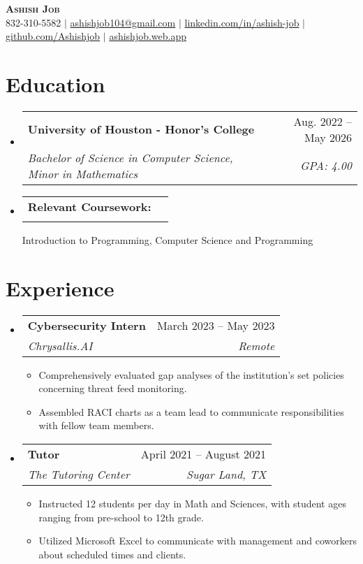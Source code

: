 \documentclass[letterpaper,11pt]{article}
\makeatletter
\newcommand{\resumeItem}[1]{
  \item\small{
    {#1 \vspace{-2pt}}
  }
}
\newcommand{\resumeSubheading}[4]{
  \vspace{-2pt}\item
    \begin{tabular*}{0.97\textwidth}[t]{l@{\extracolsep{\fill}}r}
      \textbf{#1} & #2 \\
      \textit{\small#3} & \textit{\small #4} \\
    \end{tabular*}\vspace{-7pt}
}
\newcommand{\resumeSubSubheading}[2]{
    \item
    \begin{tabular*}{0.97\textwidth}{l@{\extracolsep{\fill}}r}
      \textit{\small#1} & \textit{\small #2} \\
    \end{tabular*}\vspace{-7pt}
}
\newcommand{\resumeSubHeadingListStart}{\begin{itemize}[leftmargin=0.15in, label={}]}
\newcommand{\resumeSubHeadingListEnd}{\end{itemize}}
\newcommand{\resumeItemListStart}{\begin{itemize}}
\newcommand{\resumeItemListEnd}{\end{itemize}\vspace{-5pt}}
\makeatother
\begin{document}

\begin{center}
    \textbf{\Huge \scshape Ashish Job} \\ \vspace{1pt}
    \small {832-310-5582} $|$ \href{mailto:ashishjob104@gmail.com}{{ashishjob104@gmail.com}} $|$ 
    \href{https://linkedin.com/in/ashish-job/}{{linkedin.com/in/ashish-job}} 
    $|$ \href{https://github.com/Ashishjob}{{github.com/Ashishjob}}
    $|$ \href{https://ashishjob.web.app/}{{ashishjob.web.app}}
    
\end{center}


\section{Education}
  \resumeSubHeadingListStart
    \resumeSubheading
      {University of Houston - Honor's College}{Aug. 2022 -- May 2026}
      {Bachelor of Science in Computer Science, Minor in Mathematics}{GPA: 4.00}
    \resumeSubheading{Relevant Coursework:}{}{}{}{Introduction to Programming,}{ Computer Science and Programming}
  \resumeSubHeadingListEnd


\section{Experience}
  \resumeSubHeadingListStart
  
    \resumeSubheading
      {Cybersecurity Intern}{March 2023 -- May 2023}
      {Chrysallis.AI}{Remote}
      \resumeItemListStart
        \resumeItem{Comprehensively evaluated gap analyses of the institution's set policies concerning threat feed monitoring.}
        \resumeItem{Assembled RACI charts as a team lead to communicate responsibilities with fellow team members.}
      \resumeItemListEnd
      
    \resumeSubheading
      {Tutor}{April 2021 -- August 2021}
      {The Tutoring Center}{Sugar Land, TX}
      \resumeItemListStart
        \resumeItem{Instructed 12 students per day in Math and Sciences, with student ages ranging from pre-school to 12th grade.}
        \resumeItem{Utilized Microsoft Excel to communicate with management and coworkers about scheduled times and clients.}
      \resumeItemListEnd
    \resumeSubHeadingListEnd
      
\end{document}
